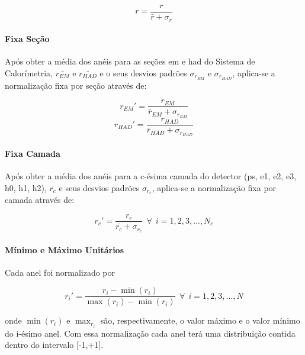 \begin{equation}
r =   \frac{r}{\bar{r} + \sigma_{r}} 
\end{equation}


\paragraph{Fixa Seção}

Após obter a média dos anéis para as seções \gls{em} e \gls{had} do Sistema de
Calorímetria, $\bar{r_{EM}}$ e $\bar{r_{HAD}}$ e o seus desvios padrões
$\sigma_{r_{EM}}$ e $\sigma_{r_{HAD}}$, aplica-se a normalização fixa por seção
através de:

\begin{equation}
r_{EM}' =   \frac{r_{EM}}{\bar{r}_{EM} + \sigma_{r_{EM}}} 
\end{equation}
\begin{equation}
r_{HAD}' =   \frac{r_{HAD}}{\bar{r}_{HAD} + \sigma_{r_{HAD}}}
\end{equation}

\paragraph{Fixa Camada}

Após obter a média dos anéis para a c-ésima camada do detector (\gls{ps},
\gls{e1}, \gls{e2}, \gls{e3}, \gls{h0}, \gls{h1}, \gls{h2}), $\bar{r_c}$ e seus
desvios padrões $\sigma_{r_c}$, aplica-se a normalização fixa por camada
através de:

\begin{equation}
r_{c}' =   \frac{r_c}{\bar{r_c} + \sigma_{r_c}} ~~\forall~~i=1,2,3,...,N_c
\end{equation}

\paragraph{Mínimo e Máximo Unitários}

Cada anel foi normalizado por

\begin{equation}
r_{i}' =   \frac{r_i - \min(r_{i}) }{\max(r_{i}) - \min(r_{i})}   ~~\forall~~i=1,2,3,...,N
\end{equation}

\noindent onde $\min(r_{i})$ e $\max_{r_i}$ são, respectivamente, o valor máximo
e o valor mínimo do i-ésimo anel. Com essa normalização cada anel terá uma
distribuição contida dentro do intervalo [-1,+1].

